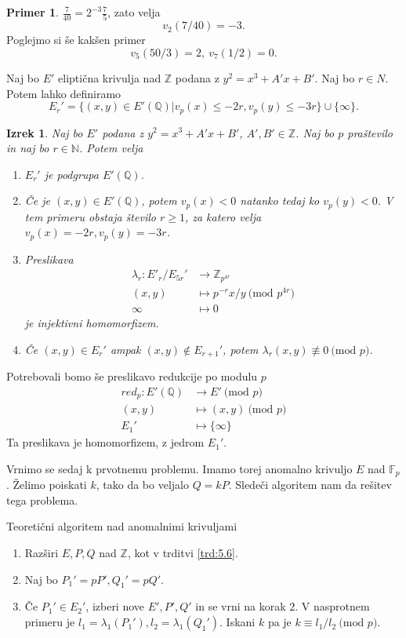 \documentclass[12pt,a4paper,twoside]{article}
\theoremstyle{definition} %
\newtheorem{primer}[definicija]{Primer}
\theoremstyle{plain} %
\newtheorem{izrek}[definicija]{Izrek}
\numberwithin{equation}{section}  %
\newcommand{\N}{\mathbb N}
\newcommand{\Z}{\mathbb Z}
\newcommand{\Q}{\mathbb Q}
\newcommand{\F}{\mathbb F}
\newcommand{\MOD}[1]{\ \text{(mod }{#1}\text{)}}
\begin{document}
\begin{primer}

$\frac{7}{40} = 2^{-3}\frac{7}{5}$, zato velja
$$v_2(7/40) = -3.$$
Poglejmo si še kakšen primer
$$v_5(50/3) = 2,\ v_7(1/2) = 0.$$
\end{primer}

Naj bo $E'$ eliptična krivulja nad $\Z$ podana z $y^2 = x^3+A'x+B'$. Naj bo $r \in N$. Potem lahko definiramo
$$E_r' = \{  (x,y) \in E'(\Q) | v_p(x) \leq -2r, v_p(y) \leq -3r \} \cup \{ \infty \}.$$

\begin{izrek}

Naj bo $E'$ podana z $y^2 = x^3+A'x+B'$, $A',B' \in \Z$. Naj bo $p$ praštevilo in naj bo $r \in \N$. Potem velja
\begin{enumerate}

\item $E_r'$ je podgrupa $E'(\Q)$.
\item Če je $(x,y) \in E'(\Q)$, potem $v_p(x)<0$ natanko tedaj ko $v_p(y) <0$. V tem primeru obstaja število $r \geq 1$, za katero velja $v_p(x) = -2r, v_p(y) = -3r$.
\item Preslikava
\begin{align}
\lambda_r: E'_r/E_{5r}' &{}\rightarrow \Z_{p^{4r}} \nonumber \\
(x,y) &{}\mapsto p^{-r}x/y \MOD{p^{4r}} \nonumber \\
\infty &{}\mapsto 0 \nonumber
\end{align}
je injektivni homomorfizem.
\item Če $(x,y) \in E_r'$ ampak $(x,y) \not \in E_{r+1}'$, potem $\lambda_r(x,y) \not \equiv 0 \MOD{p}$.

\end{enumerate}
\end{izrek}

Potrebovali bomo še preslikavo redukcije po modulu $p$
\begin{align}
red_p: E'(\Q) &{}\rightarrow E' \MOD{p} \nonumber \\
(x,y) &{}\mapsto (x,y) \MOD{p} \nonumber \\
E_1' &{}\mapsto \{ \infty \} \nonumber
\end{align}
Ta preslikava je homomorfizem, z jedrom $E_1'$.

Vrnimo se sedaj k prvotnemu problemu. Imamo torej anomalno krivuljo $E$ nad $\F_p$. Želimo poiskati $k$, tako da bo veljalo $Q = kP$. Sledeči algoritem nam da rešitev tega problema.

\begin{algorithm}[H]
\caption[AN]{Teoretični algoritem nad anomalnimi krivuljami}
\label{alg:Anomal}
\begin{enumerate}
\item Razširi $E,P,Q$ nad $\Z$, kot v trditvi \ref{trd:5.6}.
\item Naj bo $P_1' = pP',Q_1' = pQ'$.
\item Če $P_1' \in E_2'$, izberi nove $E',P',Q'$ in se vrni na korak $2$. V nasprotnem primeru je $l_1 = \lambda_1(P_1'),l_2 = \lambda_1(Q_1')$. Iskani $k$ pa je $k \equiv l_1/l_2 \MOD{p}$.
\end{enumerate}

\end{algorithm}
\end{document}
